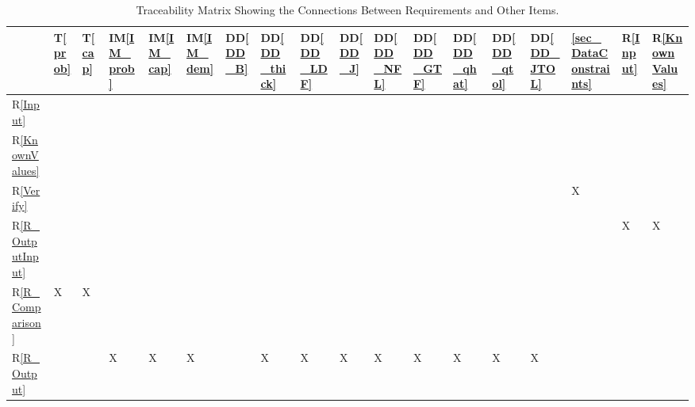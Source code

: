 \documentclass[12pt]{article}
\newcommand{\ddref}[1]{DD\ref{#1}}
\newcommand{\tref}[1]{T\ref{#1}}
\newcommand{\iref}[1]{IM\ref{#1}}
\newcommand{\rref}[1]{R\ref{#1}}
\begin{document}
\newpage

\begin{table}[h!]
\centering
\begin{tabular}{|P{0.4cm}|P{0.4cm}|P{0.4cm}|P{0.6cm}|P{0.6cm}|P{0.6cm}|P{0.65cm}|
P{0.65cm}|P{0.65cm}|P{0.65cm}|P{0.65cm}|P{0.65cm}|P{0.65cm}|P{0.65cm}|P{0.65cm}|
P{0.8cm}|P{0.4cm}|P{0.4cm}|}
\hline
	& \tref{prob} & \tref{cap} & \iref{IM_prob} & \iref{IM_cap} &
	\iref{IM_dem} & \ddref{DD_B} & \ddref{DD_thick} & \ddref{DD_LDF} &
	\ddref{DD_J} & \ddref{DD_NFL} & \ddref{DD_GTF} & \ddref{DD_qhat} &
	\ddref{DD_qtol} & \ddref{DD_JTOL} & \ref{sec_DataConstraints} &
	\rref{Input} & \rref{KnownValues}\\
\hline
\rref{Input}                 & & & & & & & & & & & & & & & & & \\ \hline
\rref{KnownValues}   & & & & & & & & & & & & & & & & & \\ \hline
\rref{Verify}                & & & & & & & & & & & & & & & X & & \\ \hline
\rref{R_OutputInput}  & & & & & & & & & & & & & & & & X & X \\ \hline
\rref{R_ Comparison}  & X & X & & & & & & & & & & & & & & & \\ \hline
\rref{R_Output}          & & & X & X & X & & X & X & X & X & X & X & X & X & & & \\
\hline
\end{tabular}
\caption{Traceability Matrix Showing the Connections Between Requirements and Other Items.}
\label{Table:R_trace}
\end{table}

\newpage
\end{document}
